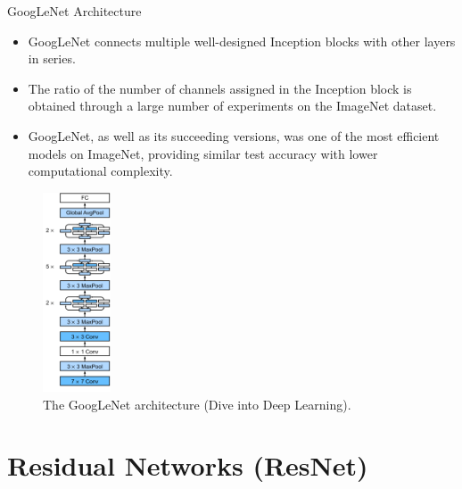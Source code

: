 \begin{vbframe}{GoogLeNet Architecture}
    \begin{itemize}
        \item GoogLeNet connects multiple well-designed Inception blocks with other layers in series. 
        \item The ratio of the number of channels assigned in the Inception block is obtained through a large number of experiments on the ImageNet dataset.
        \item GoogLeNet, as well as its succeeding versions, was one of the most efficient models on ImageNet, providing similar test accuracy with lower computational complexity.
    \end{itemize}
    \framebreak
    
  \begin{figure}
  \centering
    \includegraphics[width=2cm]{plots/moderncnn/inception-full.png}
    \caption{The GoogLeNet architecture (Dive into Deep Learning).}
  \end{figure}
    
\end{vbframe}


\section{Residual Networks (ResNet)}


